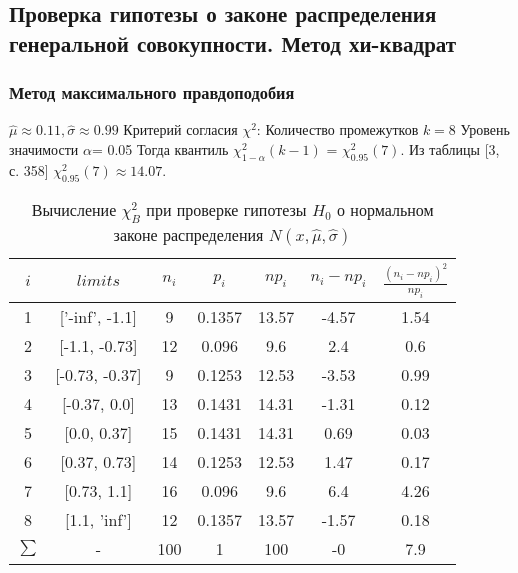 \subsection{Проверка гипотезы о законе распределения генеральной совокупности. Метод хи-квадрат}

\subsubsection{Метод максимального правдоподобия}
\newline
$\hat{\mu} \approx 0.11, \hat{\sigma} \approx 0.99$
\newline
Критерий согласия $\chi^{2}$:
\newline
Количество промежутков $k = 8$
\newline
Уровень значимости $\alpha$= 0.05
\newline
Тогда квантиль $\chi^{2}_{1-\alpha}(k-1)$ = $\chi^{2}_{0.95}(7)$. Из таблицы [3, с. 358] $\chi^{2}_{0.95}(7) \approx 14.07$.
\begin{table}[H]
	\centering
	\begin{tabular}{| c | c | c | c | c | c | c |}
		\hline
		$i$ & $limits$         &   $n_i$ &    $p_i$ &   $np_i$ &   $n_i - np_i$ &   $\frac{(n_i-np_i)^2}{np_i}$ \\
		\hline
   1 & ['-inf', -1.1] &     9 & 0.1357 &  13.57 &        -4.57 &                        1.54 \\
   2 & [-1.1, -0.73]  &    12 & 0.096  &   9.6  &         2.4  &                        0.6  \\
   3 & [-0.73, -0.37] &     9 & 0.1253 &  12.53 &        -3.53 &                        0.99 \\
   4 & [-0.37, 0.0]   &    13 & 0.1431 &  14.31 &        -1.31 &                        0.12 \\
   5 & [0.0, 0.37]    &    15 & 0.1431 &  14.31 &         0.69 &                        0.03 \\
   6 & [0.37, 0.73]   &    14 & 0.1253 &  12.53 &         1.47 &                        0.17 \\
   7 & [0.73, 1.1]    &    16 & 0.096  &   9.6  &         6.4  &                        4.26 \\
   8 & [1.1, 'inf']   &    12 & 0.1357 &  13.57 &        -1.57 &                        0.18 \\
   $\sum$ & -            &   100 & 1      & 100    &        -0    &                        7.9  \\
		\hline
	\end{tabular}
	\caption{ Вычисление $\chi^{2}_{B}$ при проверке гипотезы $H_{0}$ о нормальном законе распределения $N(x,\hat{\mu}, \hat{\sigma})$}
	\label{tab:normal_chi_2}
\end{table}

